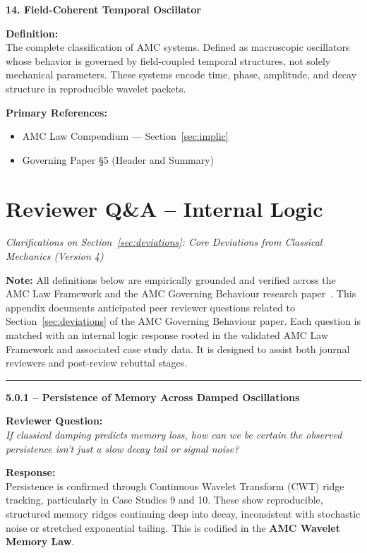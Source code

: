 \documentclass[10pt,aps,pre,onecolumn,superscriptaddress,notitlepage]{revtex4-2}
\begin{document}
\vspace{1em}

\noindent\textbf{14. Field-Coherent Temporal Oscillator}

\textbf{Definition:} \\
The complete classification of AMC systems. Defined as macroscopic oscillators whose behavior is governed by field-coupled temporal structures, not solely mechanical parameters. These systems encode time, phase, amplitude, and decay structure in reproducible wavelet packets.

\textbf{Primary References:}
\begin{itemize}[leftmargin=1.5em]
  \item AMC Law Compendium — Section~\ref{sec:implic}
  \item Governing Paper §5 (Header and Summary)
\end{itemize}

\clearpage
\section{Reviewer Q\&A – Internal Logic}
\label{sec:appendixB}
\textit{Clarifications on Section~\ref{sec:deviations}: Core Deviations from Classical Mechanics (Version 4)}

\vspace{1em}
\noindent\textbf{Note:} All definitions below are empirically grounded and verified across the AMC Law Framework and the AMC Governing Behaviour research paper~\cite{karim2025governing}.
This appendix documents anticipated peer reviewer questions related to Section~\ref{sec:deviations} of the AMC Governing Behaviour paper. Each question is matched with an internal logic response rooted in the validated AMC Law Framework and associated case study data. It is designed to assist both journal reviewers and post-review rebuttal stages.

\vspace{1em}
\hrule
\vspace{1em}

\textbf{5.0.1 – Persistence of Memory Across Damped Oscillations}

\textbf{Reviewer Question:} \\
\textit{If classical damping predicts memory loss, how can we be certain the observed persistence isn’t just a slow decay tail or signal noise?}

\textbf{Response:} \\
Persistence is confirmed through Continuous Wavelet Transform (CWT) ridge tracking, particularly in Case Studies 9 and 10. These show reproducible, structured memory ridges continuing deep into decay, inconsistent with stochastic noise or stretched exponential tailing. This is codified in the \textbf{AMC Wavelet Memory Law}.
\end{document}
